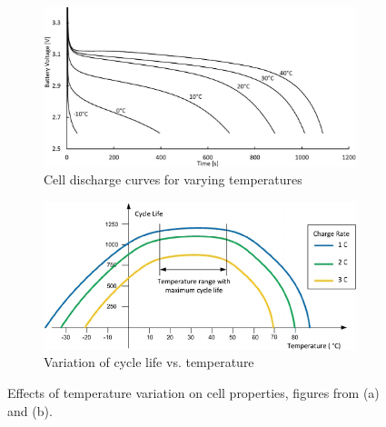 \begin{figure}[H]
    \centering
    \begin{subfigure}[b]{0.47\textwidth} %
        \centering
        \includegraphics[width=\textwidth]{figs/Samuel/Figures/chenbattery.png}
        \caption{Cell discharge curves for varying temperatures \cite{chen2013heat}}
        \label{fig:tempy1}
    \end{subfigure}
    \hspace{0.04\textwidth}
    \begin{subfigure}[b]{0.47
    \textwidth} %
        \centering
        \includegraphics[width=\textwidth]{figs/Samuel/Figures/Lithium-ion-battery-life-vs-temperature-and-charging-rate-36-39-44-45.png}
        \caption{Variation of cycle life vs. temperature \cite{REZVANIZANIANI2014110}}
        \label{fig:tempy2}
    \end{subfigure}
    \caption[Effects of Temperature Variation on Cell Properties]{Effects of temperature variation on cell properties, figures from \cite{chen2013heat} (a) and \cite{REZVANIZANIANI2014110} (b).}
    \label{fig:tempythings}
\end{figure}

